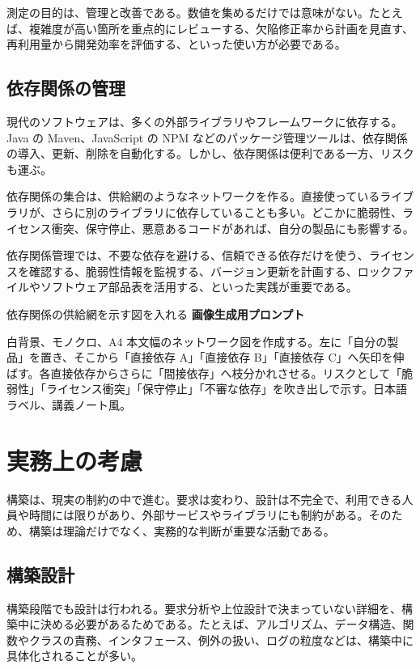 \documentclass[a4paper,11pt,ja=standard,xelatex]{bxjsarticle}
\begin{document}
測定の目的は、管理と改善である。数値を集めるだけでは意味がない。たとえば、複雑度が高い箇所を重点的にレビューする、欠陥修正率から計画を見直す、再利用量から開発効率を評価する、といった使い方が必要である。

\subsection{依存関係の管理}

現代のソフトウェアは、多くの外部ライブラリやフレームワークに依存する。Java の Maven、JavaScript の NPM などのパッケージ管理ツールは、依存関係の導入、更新、削除を自動化する。しかし、依存関係は便利である一方、リスクも運ぶ。

依存関係の集合は、供給網のようなネットワークを作る。直接使っているライブラリが、さらに別のライブラリに依存していることも多い。どこかに脆弱性、ライセンス衝突、保守停止、悪意あるコードがあれば、自分の製品にも影響する。

依存関係管理では、不要な依存を避ける、信頼できる依存だけを使う、ライセンスを確認する、脆弱性情報を監視する、バージョン更新を計画する、ロックファイルやソフトウェア部品表を活用する、といった実践が重要である。

\begin{todobox}{依存関係の供給網を示す図を入れる}
\textbf{画像生成用プロンプト}

白背景、モノクロ、A4 本文幅のネットワーク図を作成する。左に「自分の製品」を置き、そこから「直接依存 A」「直接依存 B」「直接依存 C」へ矢印を伸ばす。各直接依存からさらに「間接依存」へ枝分かれさせる。リスクとして「脆弱性」「ライセンス衝突」「保守停止」「不審な依存」を吹き出しで示す。日本語ラベル、講義ノート風。
\end{todobox}

\section{実務上の考慮}

構築は、現実の制約の中で進む。要求は変わり、設計は不完全で、利用できる人員や時間には限りがあり、外部サービスやライブラリにも制約がある。そのため、構築は理論だけでなく、実務的な判断が重要な活動である。

\subsection{構築設計}

構築段階でも設計は行われる。要求分析や上位設計で決まっていない詳細を、構築中に決める必要があるためである。たとえば、アルゴリズム、データ構造、関数やクラスの責務、インタフェース、例外の扱い、ログの粒度などは、構築中に具体化されることが多い。
\end{document}
